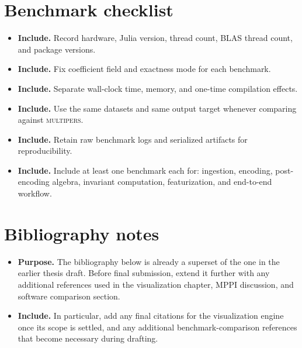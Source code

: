 \documentclass[11pt]{article}
\newcommand{\multipers}{\textsc{multipers}}
\newenvironment{plan}{\begin{itemize}[leftmargin=1.6em,itemsep=0.35em,topsep=0.25em]}{\end{itemize}}
\newcommand{\purpose}[1]{\item \textbf{Purpose.} #1}
\newcommand{\includeitems}[1]{\item \textbf{Include.} #1}
\begin{document}
\section{Benchmark checklist}\label{app:benchmark-checklist}

\begin{plan}
    \includeitems{Record hardware, Julia version, thread count, BLAS thread count, and package versions.}
    \includeitems{Fix coefficient field and exactness mode for each benchmark.}
    \includeitems{Separate wall-clock time, memory, and one-time compilation effects.}
    \includeitems{Use the same datasets and same output target whenever comparing against \multipers{}.}
    \includeitems{Retain raw benchmark logs and serialized artifacts for reproducibility.}
    \includeitems{Include at least one benchmark each for: ingestion, encoding, post-encoding algebra, invariant computation, featurization, and end-to-end workflow.}
\end{plan}

\section{Bibliography notes}\label{app:bibliography-notes}

\begin{plan}
    \purpose{The bibliography below is already a superset of the one in the earlier thesis draft. Before final submission, extend it further with any additional references used in the visualization chapter, MPPI discussion, and software comparison section.}
    \includeitems{In particular, add any final citations for the visualization engine once its scope is settled, and any additional benchmark-comparison references that become necessary during drafting.}
\end{plan}
\end{document}
